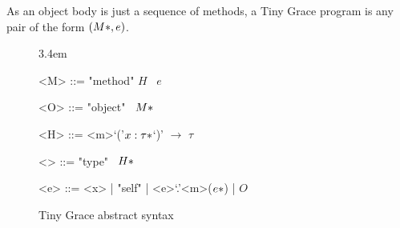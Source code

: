 As an object body is just a sequence of methods, a Tiny Grace program is any
pair of the form $(\*M*, e)$.

\begin{figure}[h]
  \centering

  \grammarindent3.4em
  \renewcommand{\grammarlabel}[2]{$#1$\hfill#2}
  \renewcommand{\syntleft}{\itshape}
  \renewcommand{\syntright}{}
  \renewcommand{\ulitleft}{\sffamily\bfseries}
  \renewcommand{\litleft}{\sffamily}
  \renewcommand{\litright}{}

  \vspace{1em}
  \begin{minipage}{11.7em}
    \begin{grammar}
      <M> ::= "method" $H$ \bo~$e$ \bc

      <O> ::= "object" \bo~$\*M*$ \bc

      <H> ::= <m>`('$\*x : \tau*$`)' $\to$ $\tau$

      <\tau> ::= "type" \bo~$\*H*$ \bc

      <e> ::= <x> | "self" | <e>`.'<m>($\*e*$) | $O$
    \end{grammar}
  \end{minipage}

  \caption{Tiny Grace abstract syntax}\label{fig:abstract-syntax}
\end{figure}


